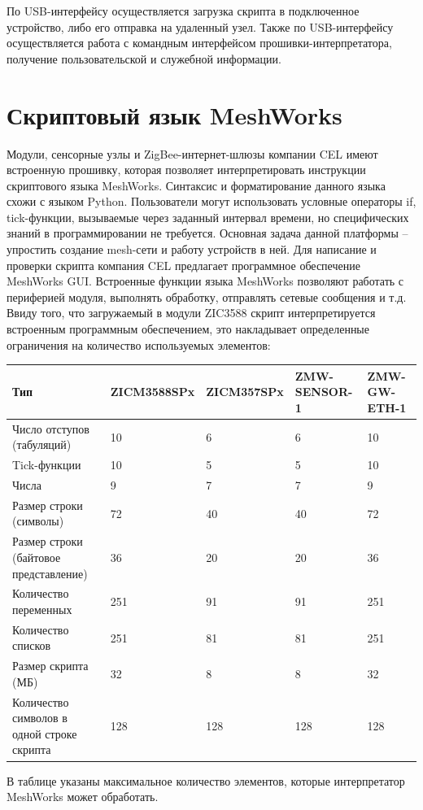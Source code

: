 \documentclass[12pt]{article}
\begin{document}
По USB-интерфейсу осуществляется загрузка скрипта в подключенное устройство, либо 
его отправка на удаленный узел. Также по USB-интерфейсу осуществляется работа с
командным интерфейсом прошивки-интерпретатора, получение пользовательской и служебной
информации.

\section{Скриптовый язык MeshWorks}

Модули, сенсорные узлы и ZigBee-интернет-шлюзы компании CEL имеют встроенную 
прошивку, которая позволяет интерпретировать инструкции скриптового языка 
MeshWorks. Синтаксис и форматирование данного языка схожи с языком Python. 
Пользователи могут использовать условные операторы if, tick-функции, вызываемые 
через заданный интервал времени, но специфических знаний в программировании не 
требуется. Основная задача данной платформы – упростить создание mesh-сети и 
работу устройств в ней.
Для написание и проверки скрипта компания CEL предлагает программное обеспечение 
MeshWorks GUI. Встроенные функции языка MeshWorks позволяют работать с периферией 
модуля, выполнять обработку, отправлять сетевые сообщения и т.д.
Ввиду того, что загружаемый в модули ZIC3588 скрипт интерпретируется встроенным 
программным обеспечением, это накладывает определенные ограничения на количество 
используемых элементов:
\begin{center}
\begin{tabular}{ |p{3cm}|p{}|p{}|p{2cm}|p{2cm}| } 
 \hline
 Тип & ZICM3588SPx & ZICM357SPx & ZMW-SENSOR-1 & ZMW-GW-ETH-1 \\
 \hline
 Число отступов (табуляций) & 10 & 6 & 6 & 10 \\ 
 Tick-функции & 10 & 5 & 5 & 10 \\ 
 Числа & 9 & 7 & 7 & 9 \\ 
 Размер строки (символы) & 72 & 40 & 40 & 72 \\
 Размер строки (байтовое представление) & 36 & 20 & 20 & 36 \\
 Количество переменных & 251 & 91 & 91 & 251 \\
 Количество списков & 251 & 81 & 81 & 251 \\
 Размер скрипта (МБ) & 32 & 8 & 8 & 32 \\
 Количество символов в одной строке скрипта & 128 & 128 & 128 & 128 \\
 \hline
\end{tabular}
\end{center}
В таблице указаны максимальное количество элементов, которые интерпретатор MeshWorks может обработать.
\end{document}
